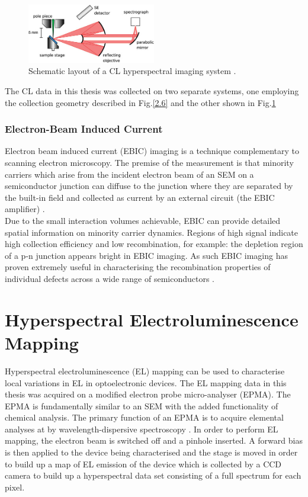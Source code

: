 \begin{figure}[!ht]
	\centering
	\includegraphics[width=0.5\textwidth]{Figs/Ch2/hyper.png}
	\caption[h] {Schematic layout of a CL hyperspectral imaging system \cite{Edwards2012}.}
	\label{2.7}
\end{figure}
\FloatBarrier

The CL data in this thesis was collected on two separate systems, one employing the collection geometry described in Fig.\ref{2.6} and the other shown in Fig.\ref{2.7}
\subsubsection{Electron-Beam Induced Current}

Electron beam induced current  (EBIC) imaging is a technique complementary to scanning electron microscopy. The premise of the measurement is that minority carriers which arise from the incident electron beam of an SEM on a semiconductor junction can diffuse to the junction where they are separated by the built-in field and collected as current by an external circuit (the EBIC amplifier) \cite{Haegel2009}.\\
Due to the small interaction volumes achievable, EBIC can provide detailed spatial information on minority carrier dynamics. Regions of high signal indicate high collection efficiency and low recombination, for example: the depletion region of a p-n junction appears bright in EBIC imaging. As such EBIC imaging has proven extremely useful in characterising the recombination properties of individual defects across a wide range of semiconductors \cite{Yakimov2002}.  


\section{Hyperspectral Electroluminescence Mapping}
Hyperspectral electroluminescence   (EL) mapping can be used to characterise local variations in EL in optoelectronic devices. The EL mapping data in this thesis was acquired on a modified electron probe micro-analyser  (EPMA). The EPMA is fundamentally similar to an SEM with the added functionality of chemical analysis. The primary function of an EPMA is to acquire elemental analyses at by wavelength-dispersive spectroscopy \cite{Jansen1982}. In order to perform EL mapping, the electron beam is switched off and a pinhole inserted. A forward bias is then applied to the device being characterised and the stage is moved in order to build up a map of EL emission of the device which is collected by a CCD camera to build up a hyperspectral data set consisting of a full spectrum for each pixel.



